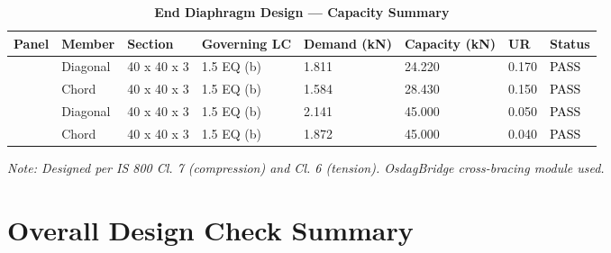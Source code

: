 \documentclass[12pt,a4paper]{report}
\numberwithin{table}{chapter}
\numberwithin{figure}{chapter}
\begin{document}
\vspace{1em}

\begin{longtable}{|C{2.0cm}|L{1.8cm}|C{2.2cm}|C{3.0cm}|C{1.8cm}|C{1.8cm}|C{1.2cm}|C{1.8cm}|}
\caption{\textbf{End Diaphragm Design --- Capacity Summary}}
\hline
\textbf{Panel} & \textbf{Member} & \textbf{Section} & \textbf{Governing LC} & \textbf{Demand (kN)} & \textbf{Capacity (kN)} & \textbf{UR} & \textbf{Status} \\[6pt]
\hline
{} & Diagonal & 40 x 40 x 3 & 1.5 EQ (b) & 1.811 & 24.220 & 0.170 & \textcolor{black}{PASS} \\[6pt]
 & Chord & 40 x 40 x 3 & 1.5 EQ (b) & 1.584 & 28.430 & 0.150 & \textcolor{black}{PASS} \\[6pt]
\hline
{} & Diagonal & 40 x 40 x 3 & 1.5 EQ (b) & 2.141 & 45.000 & 0.050 & \textcolor{black}{PASS} \\[6pt]
 & Chord & 40 x 40 x 3 & 1.5 EQ (b) & 1.872 & 45.000 & 0.040 & \textcolor{black}{PASS} \\[6pt]
\hline
\end{longtable}
\noindent\textit{Note: Designed per IS 800 Cl. 7 (compression) and Cl. 6 (tension). OsdagBridge cross-bracing module used.}

\section{Overall Design Check Summary}
\label{sec:overall-summary}
\end{document}
